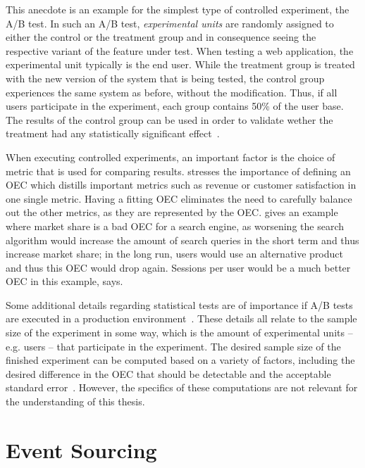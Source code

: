 This anecdote is an example for the simplest type of controlled experiment, the A/B test.
In such an A/B test, \emph{experimental units} are randomly assigned to either the control or the treatment group and in consequence seeing the respective variant of the feature under test.
When testing a web application, the experimental unit typically is the end user.
While the treatment group is treated with the new version of the system that is being tested, the control group experiences the same system as before, without the modification.
Thus, if all users participate in the experiment, each group contains 50\% of the user base.
The results of the control group can be used in order to validate wether the treatment had any statistically significant effect~\cite{Kohavi2009}.

When executing controlled experiments, an important factor is the choice of metric that is used for comparing results.
\citet{Kohavi2013a} stresses the importance of defining an \ac{OEC} which distills important metrics such as revenue or customer satisfaction in one single metric.
Having a fitting \ac{OEC} eliminates the need to carefully balance out the other metrics, as they are represented by the \ac{OEC}.
\citeauthor{Kohavi2013a} gives an example where market share is a bad \ac{OEC} for a search engine, as worsening the search algorithm would increase the amount of search queries in the short term and thus increase market share; in the long run, users would use an alternative product and thus this \ac{OEC} would drop again.
Sessions per user would be a much better \ac{OEC} in this example, \citeauthor{Kohavi2013a} says.

Some additional details regarding statistical tests are of importance if A/B tests are executed in a production environment~\cite{Kohavi2009}.
These details all relate to the sample size of the experiment in some way, which is the amount of experimental units -- e.g. users -- that participate in the experiment.
The desired sample size of the finished experiment can be computed based on a variety of factors, including the desired difference in the \ac{OEC} that should be detectable and the acceptable standard error~\cite{mason2003statistical}.
However, the specifics of these computations are not relevant for the understanding of this thesis.

\section{Event Sourcing}
\label{sec:fundamentals:event}


